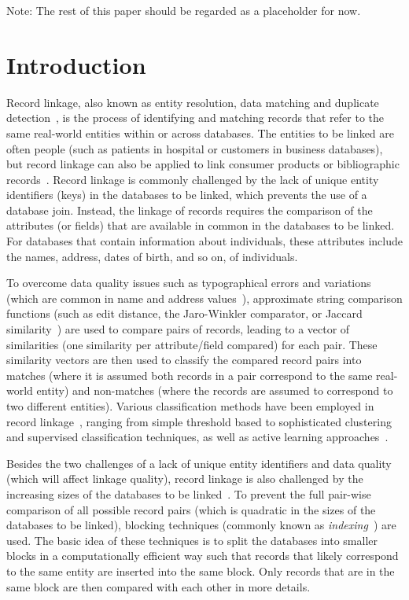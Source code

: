 \documentclass{llncs}
\begin{document}
Note: The rest of this paper should be regarded as a placeholder for now.



\section{Introduction}
\label{sec-intro}


Record linkage, also known as entity resolution, data matching and
duplicate detection~\cite{Chr12}, is the process of identifying and
matching records that refer to the same real-world entities within or
across databases. The entities to be linked are often people (such as 
patients in hospital or customers in business databases), but record
linkage can also be applied to link consumer products or bibliographic
records~\cite{Chr12}. Record linkage is commonly challenged by the
lack of unique entity identifiers (keys) in the databases to be linked,
which prevents the use of a database join. Instead, the linkage of
records requires the comparison of the attributes (or fields) that are
available in common in the databases to be linked. For databases that
contain information about individuals, these attributes include the
names, address, dates of birth, and so on, of individuals.

To overcome data quality issues such as typographical errors and
variations (which are common in name and address values~\cite{Chr12}),
approximate string comparison functions (such as edit distance, the
Jaro-Winkler comparator, or Jaccard similarity~\cite{Chr12}) are used
to compare pairs of records, leading to a vector of similarities (one
similarity per attribute/field compared) for each pair. These
similarity vectors are then used to classify the compared record
pairs into matches (where it is assumed both records in a pair
correspond to the same real-world entity) and non-matches (where the
records are assumed to correspond to two different entities). Various
classification methods have been employed in record
linkage~\cite{Chr12,Don15}, ranging from simple threshold based to
sophisticated clustering and supervised classification techniques, as
well as active learning approaches~\cite{Wan15}.

Besides the two challenges of a lack of unique entity identifiers and
data quality (which will affect linkage quality), record linkage is
also challenged by the increasing sizes of the databases to be
linked~\cite{Don15}. To prevent the full pair-wise comparison of all
possible record pairs (which is quadratic in the sizes of the
databases to be linked), blocking techniques (commonly known as
\emph{indexing}~\cite{Chr12b}) are used. The basic idea of these
techniques is to split the databases into smaller blocks in a
computationally efficient way such that records that likely correspond
to the same entity are inserted into the same block. Only records that
are in the same block are then compared with each other in more
details.
\end{document}
